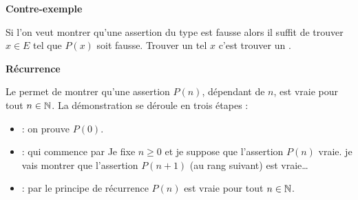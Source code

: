 \documentclass[10pt,class=article,crop=false]{standalone}
\begin{document}
\begin{multicols}{2}
\smallskip

\textbf{Contre-exemple}

Si l'on veut montrer qu'une assertion du type  est fausse alors il suffit de trouver $x \in E$ tel que $P(x)$
soit fausse. 
Trouver un tel $x$ c'est trouver un .


\smallskip

\textbf{Récurrence}

Le  permet de montrer qu'une assertion $P(n)$, dépendant de $n$,
est vraie pour tout $n \in \mathbb{N}$.
La démonstration se déroule en trois étapes :
\begin{itemize}
	\item {} : on prouve $P(0)$.
	\item {} : qui commence par \og{}Je fixe $n\ge 0$ et je suppose que l'assertion $P(n)$ vraie. je vais montrer que 
l'assertion  $P(n+1)$ (au rang suivant) est vraie\ldots\fg{}
   \item {} : par le principe de récurrence $P(n)$ est vraie pour tout $n\in\mathbb{N}$.
\end{itemize}


\end{multicols}
\end{document}
